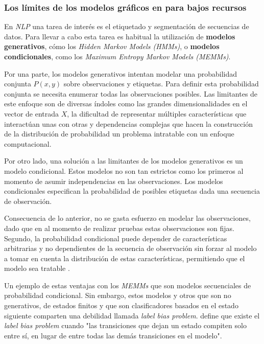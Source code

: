 \documentclass[letterpaper,12pt,oneside]{book}
\theoremstyle{definition}
\begin{document}

\subsubsection{Los límites de los modelos gráficos en para bajos recursos}


En \textit{NLP} una tarea de interés es el etiquetado y segmentación de secuencias de datos. Para llevar a cabo esta tarea es habitual la utilización de \textbf{modelos generativos}, cómo los \textit{Hidden Markov Models (HMMs)}, o \textbf{modelos condicionales}, como los \textit{Maximum Entropy Markov Models (MEMMs)}.

Por una parte, los modelos generativos intentan modelar una probabilidad conjunta $P(x,y)$ sobre observaciones y etiquetas. Para definir esta probabilidad conjunta se necesita enumerar todas las observaciones posibles. Las limitantes de este enfoque son de diversas índoles como las grandes dimensionalidades en el vector de entrada $X$, la dificultad de representar múltiples características que interactúan unas con otras y dependencias complejas que hacen la construcción de la distribución de probabilidad un problema intratable con un enfoque computacional.

Por otro lado, una solución a las limitantes de los modelos generativos es un modelo condicional. Estos modelos no son tan estrictos como los primeros al momento de asumir independencias en las observaciones. Los modelos condicionales especifican la probabilidad de posibles etiquetas dada una secuencia de observación.

Consecuencia de lo anterior, no se gasta esfuerzo en modelar las observaciones, dado que en al momento de realizar pruebas estas observaciones son fijas. Segundo, la probabilidad condicional puede depender de características arbitrarias y no dependientes de la secuencia de observación sin forzar al modelo a tomar en cuenta la distribución de estas características, permitiendo que el modelo sea tratable \citep{lafferty2001conditional}.

Un ejemplo de estas ventajas con los \textit{MEMMs} que son modelos secuenciales de probabilidad condicional. Sin embargo, estos modelos y otros que son no generativos, de estados finitos y que son clasificadores basados en el estado siguiente comparten una debilidad llamada \emph{label bias problem}. \citet{lafferty2001conditional} define que existe el \emph{label bias problem} cuando "las transiciones que dejan un estado compiten solo entre sí, en lugar de entre todas las demás transiciones en el modelo".
\end{document}
